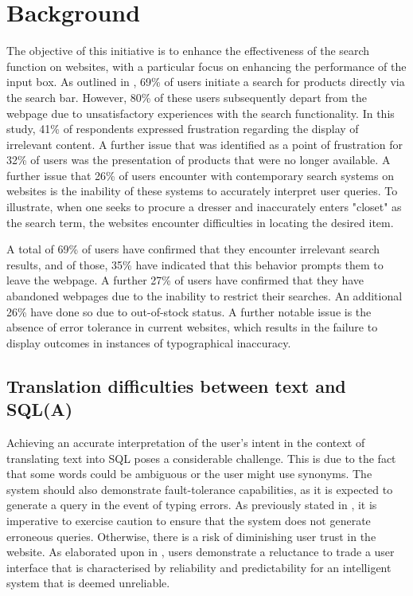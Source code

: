 \documentclass[../../submission.tex]{subfiles}
\begin{document}
\section{Background}
The objective of this initiative is to enhance the effectiveness of the search function on websites, with a particular focus on enhancing the performance of the input box. 
As outlined in  \cite{customerLeavingSites} , 69\% of users initiate a search for products directly via the search bar. 
However, 80\% of these users subsequently depart from the webpage due to unsatisfactory experiences with the search functionality. 
In this study, 41\% of respondents expressed frustration regarding the display of irrelevant content. 
A further issue that was identified as a point of frustration for 32\% of users was the presentation of products that were no longer available. 
A further issue that 26\% of users encounter with contemporary search systems on websites is the inability of these systems to accurately interpret user queries. 
To illustrate, when one seeks to procure a dresser and inaccurately enters "closet" as the search term, the websites encounter difficulties in locating the desired item. 

A total of 69\% of users have confirmed that they encounter irrelevant search results, and of those, 35\% have indicated that this behavior prompts them to leave the webpage. 
A further 27\% of users have confirmed that they have abandoned webpages due to the inability to restrict their searches. An additional 26\% have done so due to out-of-stock status. 
A further notable issue is the absence of error tolerance in current websites, which results in the failure to display outcomes in instances of typographical inaccuracy.

\subsection{Translation difficulties between text and SQL(A)}
Achieving an accurate interpretation of the user's intent in the context of translating text into SQL poses a considerable challenge. 
This is due to the fact that some words could be ambiguous or the user might use synonyms.  
The system should also demonstrate fault-tolerance capabilities, as it is expected to generate a query in the event of typing errors. 
As previously stated in \cite{popescuEtalTowardsTheoryOfNaturalLanguage}, it is imperative to exercise caution to ensure that the system does not generate erroneous queries. 
Otherwise, there is a risk of diminishing user trust in the website.  
As elaborated upon in  \cite{popescuEtalTowardsTheoryOfNaturalLanguage}, users demonstrate a reluctance to trade a user interface that is characterised by reliability and predictability for an intelligent system that is deemed unreliable.
\end{document}

